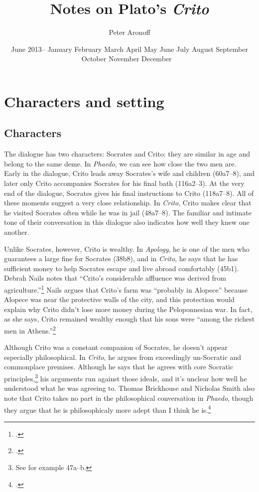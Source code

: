 \documentclass[12pt,letterpaper]{article}
\newcommand{\MONTH}{%
  \ifcase\the\month
  \or January%
  \or February%
  \or March%
  \or April%
  \or May%
  \or June%
  \or July%
  \or August%
  \or September%
  \or October%
  \or November%
  \or December%
  \fi}
\begin{document}
\begin{titlepage}
\title{Notes on Plato's \textit{Crito}}
\author{Peter Aronoff}
\date{June 2013--\MONTH\ \the\year}
\maketitle
\thispagestyle{empty}
\end{titlepage}

\section*{Characters and setting}

\subsection*{Characters}

The dialogue has two characters: Socrates and Crito: they are similar in age and belong to the same deme. In \textit{Phaedo}, we can see how close the two men are. Early in the dialogue, Crito leads away Socrates's wife and children (60a7--8), and later only Crito accompanies Socrates for his final bath (116a2--3). At the very end of the dialogue, Socrates gives his final instructions to Crito (118a7--8). All of these moments suggest a very close relationship. In \textit{Crito}, Crito makes clear that he visited Socrates often while he was in jail (48a7--8). The familiar and intimate tone of their conversation in this dialogue also indicates how well they knew one another.

Unlike Socrates, however, Crito is wealthy. In \textit{Apology}, he is one of the men who guarantees a large fine for Socrates (38b8), and in \textit{Crito}, he says that he has sufficient money to help Socrates escape and live abroad comfortably (45b1). Debrah Nails notes that ``Crito's considerable affluence was derived from agriculture.''\footcite[][115. She cites \textit{Euthydemus} 291e, Xenophon's \textit{Memorabilia} 2.9.4, and Diogenes Laertius 2.31.]{nails2002-people-of-plato} Nails argues that Crito's farm was ``probably in Alopece'' because Alopece was near the protective walls of the city, and this protection would explain why Crito didn't lose more money during the Peloponnesian war. In fact, as she says, Crito remained wealthy enough that his sons were ``among the richest men in Athens.''\footcite[][115]{nails2002-people-of-plato}

Although Crito was a constant companion of Socrates, he doesn't appear especially philosophical. In \textit{Crito}, he argues from exceedingly un-Socratic and commonplace premises. Although he says that he agrees with core Socratic principles,\footnote{See for example 47a--b.} his arguments run against those ideals, and it's unclear how well he understood what he was agreeing to. Thomas Brickhouse and Nicholas Smith also note that Crito takes no part in the philosophical conversation in \textit{Phaedo}, though they argue that he is philosophicaly more adept than I think he is.\footcite[][196]{brickhouse-smith2004-plato-trial-of-socrates}
\end{document}
